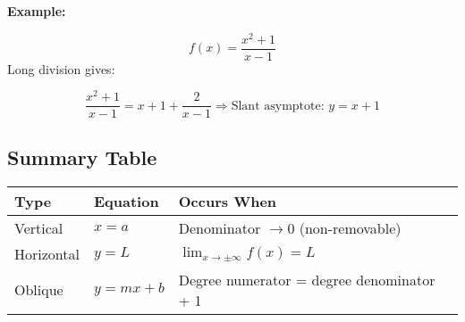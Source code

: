 \textbf{Example:}

\[
    f(x) = \frac{x^2 + 1}{x - 1}
\]
Long division gives:

\[
    \frac{x^2 + 1}{x - 1} = x + 1 + \frac{2}{x - 1}
    \Rightarrow \text{Slant asymptote: } y = x + 1
\]

\subsection{Summary Table}

\begin{center}
    \begin{tabular}{|l|l|l|}
    \hline
    \textbf{Type} & \textbf{Equation} & \textbf{Occurs When} \\
    \hline
    Vertical      & \(x = a\)           & Denominator \(\to 0\) (non-removable) \\
    Horizontal    & \(y = L\)           & \(\lim_{x \to \pm \infty} f(x) = L\) \\
    Oblique       & \(y = mx + b\)      & Degree numerator = degree denominator + 1 \\
    \hline
    \end{tabular}
\end{center}
